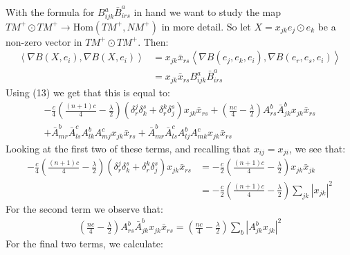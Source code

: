 \documentclass[11pt]{amsart}
\theoremstyle{definition}
\def \la { \left\langle }
\def \ra { \right\rangle }
\def \Hom{ \text{Hom} }
\def \TMp{ TM^{+} }
\def \NMp{ NM^+ }
\begin{document}
With the formula for $B^a_{ijk} \bar{B}^a_{irs}$ in hand we want to study the map $\TMp \odot \TMp \rightarrow \Hom( \TMp, \NMp )$ in more detail.  So let $X = x_{jk} e_j \odot e_k$ be a non-zero vector in $\TMp \odot \TMp$. Then:
%
\begin{align*}
\la \nabla B (X, e_i), \nabla B(X, e_i) \ra &=  x_{jk} \bar{x}_{rs} \la \nabla B(e_j, e_k, e_i), \nabla B(e_r, e_s, e_i) \ra \\
&= x_{jk} \bar{x}_{rs} B^a_{ijk} \bar{B}^a_{irs}
\end{align*}
%
Using (13) we get that this is equal to:
%
\begin{align*}
- \frac{c}{4} \left( \frac{(n+1)c}{4} - \frac{\lambda}{2} \right)\left( \delta^j_r \delta^s_k + \delta^k_r \delta^s_j \right) x_{jk} \bar{x}_{rs} + \left( \frac{nc}{4} - \frac{\lambda}{2} \right) A^b_{rs} \bar{A}^b_{jk} x_{jk} \bar{x}_{rs} \\
+ \bar{A}^b_{mr} \bar{A}^c_{ls} A^b_{lk} A^c_{mj} x_{jk} \bar{x}_{rs} + \bar{A}^b_{mr} \bar{A}^c_{ls} A^b_{lj} A^c_{mk} x_{jk} \bar{x}_{rs}
\end{align*}
%
Looking at the first two of these terms, and recalling that $x_{ij} = x_{ji}$, we see that:
%
\begin{align*}
- \frac{c}{4} \left( \frac{(n+1)c}{4} - \frac{\lambda}{2} \right) \left( \delta^j_r \delta^s_k + \delta^k_r \delta^s_j \right) x_{jk} \bar{x}_{rs} &= - \frac{c}{2} \left( \frac{(n+1)c}{4} - \frac{\lambda}{2} \right) x_{jk} \bar{x}_{jk} \\
&= - \frac{c}{2} \left( \frac{(n+1)c}{4} - \frac{\lambda}{2} \right) \sum_{jk} \left| x_{jk} \right|^2
\end{align*}
%
For the second term we observe that:
%
\begin{align*}
\left( \frac{nc}{4} - \frac{\lambda}{2} \right) A^b_{rs} \bar{A}^b_{jk} x_{jk} \bar{x}_{rs} = \left( \frac{nc}{4} - \frac{\lambda}{2} \right) \sum_{b} \left| A^b_{jk} x_{jk} \right|^2
\end{align*}
%
For the final two terms, we calculate:
%
\end{document}
